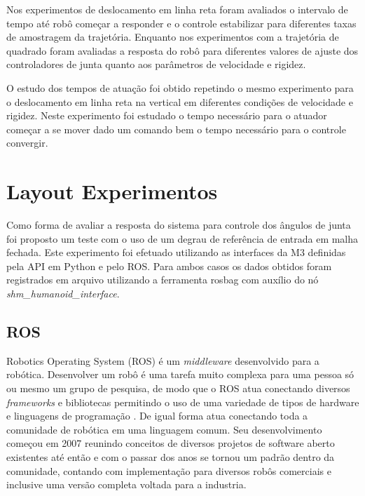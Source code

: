 Nos experimentos de deslocamento em linha reta foram avaliados o intervalo de tempo até robô começar a responder e o controle estabilizar para diferentes taxas de amostragem da trajetória. Enquanto nos experimentos com a trajetória de quadrado foram avaliadas a resposta do robô para diferentes valores de ajuste dos controladores de junta quanto aos parâmetros de velocidade e rigidez.


O estudo dos tempos de atuação foi obtido repetindo o mesmo experimento para o deslocamento em linha reta na vertical em diferentes condições de velocidade e rigidez. Neste experimento foi estudado o tempo necessário para o atuador começar a se mover dado um comando bem o tempo necessário para o controle convergir.



\section{Layout Experimentos}

Como forma de avaliar a resposta do sistema para controle dos ângulos de junta foi proposto um teste com o uso de um degrau de referência de entrada em malha fechada. Este experimento foi efetuado utilizando as interfaces da M3 definidas pela API em Python e pelo ROS. Para ambos casos os dados obtidos foram registrados em arquivo utilizando a ferramenta rosbag com auxílio do nó \textit{shm\_humanoid\_interface}.



\subsection{ROS}

Robotics Operating System (ROS) é um \textit{middleware} desenvolvido para a robótica. Desenvolver um robô é uma tarefa muito complexa para uma pessoa só ou mesmo um grupo de pesquisa, de modo que o ROS atua conectando diversos \textit{frameworks} e bibliotecas permitindo o uso de uma variedade de tipos de hardware e linguagens de programação \cite{quigley2009ros}. De igual forma atua conectando toda a comunidade de robótica em uma linguagem comum. Seu desenvolvimento começou em 2007 reunindo conceitos de diversos projetos de software aberto existentes até então e com o passar dos anos se tornou um padrão dentro da comunidade, contando com implementação para diversos robôs comerciais e inclusive uma versão completa voltada para a industria.

